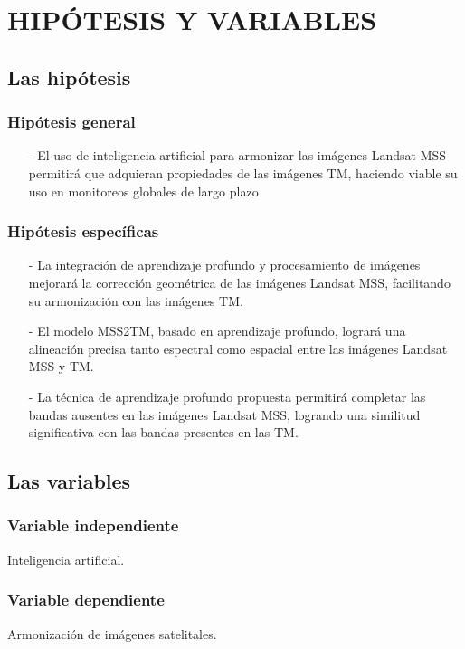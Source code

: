 \Chapter{}
\chapter{HIPÓTESIS Y VARIABLES}
    \section{Las hipótesis}
        \subsection{Hipótesis general}
            \begin{itemize}
                \item[-] El uso de inteligencia artificial para armonizar las imágenes Landsat MSS permitirá que adquieran propiedades de las imágenes TM, haciendo viable su uso en monitoreos globales de largo plazo
            \end{itemize}
        \subsection{Hipótesis específicas}
            \begin{itemize}
                \item[-] La integración de aprendizaje profundo y procesamiento de imágenes mejorará la corrección geométrica de las imágenes Landsat MSS, facilitando su armonización con las imágenes TM.
                \item[-] El modelo MSS2TM, basado en aprendizaje profundo, logrará una alineación precisa tanto espectral como espacial entre las imágenes Landsat MSS y TM.
                \item[-] La técnica de aprendizaje profundo propuesta permitirá completar las bandas ausentes en las imágenes Landsat MSS, logrando una similitud significativa con las bandas presentes en las TM.
            \end{itemize}
    \section{Las variables}
        \subsection{Variable independiente}
            Inteligencia artificial. %
        \subsection{Variable dependiente}
            Armonización de imágenes satelitales. %

